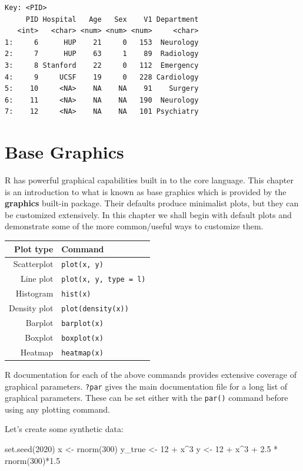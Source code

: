 \documentclass[
]{book}
\newenvironment{Shaded}{\begin{snugshade}}{\end{snugshade}}
\newcommand{\DecValTok}[1]{\textcolor[rgb]{0.00,0.00,0.81}{#1}}
\newcommand{\FloatTok}[1]{\textcolor[rgb]{0.00,0.00,0.81}{#1}}
\newcommand{\FunctionTok}[1]{\textcolor[rgb]{0.00,0.00,0.00}{#1}}
\newcommand{\NormalTok}[1]{#1}
\newcommand{\OtherTok}[1]{\textcolor[rgb]{0.56,0.35,0.01}{#1}}
\newcommand{\SpecialCharTok}[1]{\textcolor[rgb]{0.00,0.00,0.00}{#1}}
\begin{document}
\begin{verbatim}
Key: <PID>
     PID Hospital   Age   Sex    V1 Department
   <int>   <char> <num> <num> <num>     <char>
1:     6      HUP    21     0   153  Neurology
2:     7      HUP    63     1    89  Radiology
3:     8 Stanford    22     0   112  Emergency
4:     9     UCSF    19     0   228 Cardiology
5:    10     <NA>    NA    NA    91    Surgery
6:    11     <NA>    NA    NA   190  Neurology
7:    12     <NA>    NA    NA   101 Psychiatry
\end{verbatim}

\hypertarget{basegraphics}{%
\chapter{Base Graphics}\label{basegraphics}}

R has powerful graphical capabilities built in to the core language. This chapter is an introduction to what is known as base graphics which is provided by the \textbf{graphics} built-in package. Their defaults produce minimalist plots, but they can be customized extensively. In this chapter we shall begin with default plots and demonstrate some of the more common/useful ways to customize them.

\begin{longtable}[]{@{}rl@{}}
\toprule
Plot type & Command\tabularnewline
\midrule
\endhead
Scatterplot & \texttt{plot(x,\ y)}\tabularnewline
Line plot & \texttt{plot(x,\ y,\ type\ =\ \textquotesingle{}l\textquotesingle{})}\tabularnewline
Histogram & \texttt{hist(x)}\tabularnewline
Density plot & \texttt{plot(density(x))}\tabularnewline
Barplot & \texttt{barplot(x)}\tabularnewline
Boxplot & \texttt{boxplot(x)}\tabularnewline
Heatmap & \texttt{heatmap(x)}\tabularnewline
\bottomrule
\end{longtable}

R documentation for each of the above commands provides extensive coverage of graphical parameters. \texttt{?par} gives the main documentation file for a long list of graphical parameters. These can be set either with the \texttt{par()} command before using any plotting command.

Let's create some synthetic data:

\begin{Shaded}
\begin{Highlighting}[]
\FunctionTok{set.seed}\NormalTok{(}\DecValTok{2020}\NormalTok{)}
\NormalTok{x }\OtherTok{\textless{}{-}} \FunctionTok{rnorm}\NormalTok{(}\DecValTok{300}\NormalTok{)}
\NormalTok{y\_true }\OtherTok{\textless{}{-}} \DecValTok{12} \SpecialCharTok{+}\NormalTok{ x}\SpecialCharTok{\^{}}\DecValTok{3}
\NormalTok{y }\OtherTok{\textless{}{-}} \DecValTok{12} \SpecialCharTok{+}\NormalTok{ x}\SpecialCharTok{\^{}}\DecValTok{3} \SpecialCharTok{+} \FloatTok{2.5} \SpecialCharTok{*} \FunctionTok{rnorm}\NormalTok{(}\DecValTok{300}\NormalTok{)}\SpecialCharTok{*}\FloatTok{1.5}
\end{Highlighting}
\end{Shaded}
\end{document}
